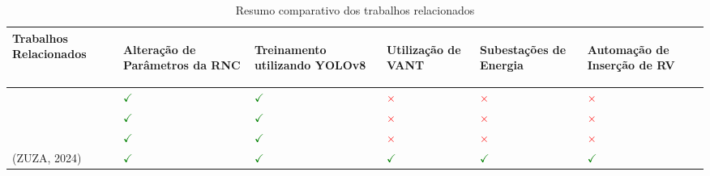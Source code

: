 \begin{table}[!hbt]
    \centering
    \caption{Resumo comparativo dos trabalhos relacionados}
    \begin{tabular}{ >{\centering\arraybackslash}m{5cm} | >{\centering\arraybackslash}m{2cm} | >{\centering\arraybackslash}m{2cm} | >{\centering\arraybackslash}m{2cm} | >{\centering\arraybackslash}m{2cm} | >{\centering\arraybackslash}m{2cm} }
    \hline
    \cellcolor[gray]{0.9} \textbf{Trabalhos Relacionados} & 
    \cellcolor[gray]{0.9} \begin{sideways} \textbf{Alteração de Parâmetros da RNC} \end{sideways} & 
    \cellcolor[gray]{0.9} \begin{sideways} \textbf{Treinamento utilizando YOLOv8} \end{sideways} & 
    \cellcolor[gray]{0.9} \begin{sideways} \textbf{Utilização de VANT} \end{sideways} & 
    \cellcolor[gray]{0.9} \begin{sideways} \textbf{Subestações de Energia} \end{sideways} &
    \cellcolor[gray]{0.9} \begin{sideways} \textbf{Automação de Inserção de RV} \end{sideways} \\
    \hline 
    \cite{gonzaga2023identificaccao} & \textcolor{green}{\(\checkmark\)} & \textcolor{green}{\(\checkmark\)} & \textcolor{red}{\(\times\)} & \textcolor{red}{\(\times\)} & \textcolor{red}{\(\times\)} \\
    \hline
    \cite{diascomparaccao} & \textcolor{green}{\(\checkmark\)} & \textcolor{green}{\(\checkmark\)} & \textcolor{red}{\(\times\)} & \textcolor{red}{\(\times\)} & \textcolor{red}{\(\times\)} \\
    \hline
    \cite{wang2023uav} & \textcolor{green}{\(\checkmark\)} & \textcolor{green}{\(\checkmark\)} & \textcolor{red}{\(\times\)} & \textcolor{red}{\(\times\)} & \textcolor{red}{\(\times\)} \\
    \hline
    (ZUZA, 2024) & \textcolor{green}{\(\checkmark\)} & \textcolor{green}{\(\checkmark\)} & \textcolor{green}{\(\checkmark\)} & \textcolor{green}{\(\checkmark\)} & \textcolor{green}{\(\checkmark\)} \\
    \end{tabular}
    \label{tab:relacionado1}
\end{table}



